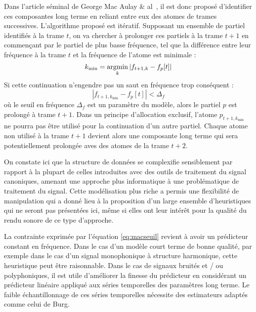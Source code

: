 Dans l'article séminal de George Mac Aulay \& al~\cite{mcaulay}, il est donc proposé \og d'identifier \fg ces composantes long terme en reliant entre eux des atomes de trames successives. L'algorithme proposé est itératif. Supposant un ensemble de partiel identifiés à la trame $t$, on va chercher à prolonger ces partiels à la trame $t+1$ en commençant par le partiel de plus basse fréquence, tel que la différence entre leur fréquence à la trame $t$ et la fréquence de l'atome est minimale :
\begin{equation}
k_{\mathrm{min}} = \operatorname*{argmin}_{k}\left|f_{t+1, k}-f_{p}[t]\right|
\label{eq:mac}
\end{equation}
Si cette continuation n'engendre pas un saut en fréquence trop conséquent :
\begin{equation}
\left|f_{t+1, k_{\mathrm{min}}}-f_{p}[t]\right|<\Delta_{f}
\label{eq:macseuil}
\end{equation}
où le seuil en fréquence $\Delta_{f}$ est un paramètre du modèle, alors le partiel $p$ est prolongé à trame $t+1$. Dans un principe d'allocation exclusif, l'atome $p_{t+1, k_{\mathrm{min}}}$ ne pourra pas être utilisé pour la continuation d'un autre partiel. Chaque atome non utilisé à la trame $t+1$ devient alors une composante long terme qui sera potentiellement prolongée aves des atomes de la trame $t+2$.

On constate ici que la structure de données se complexifie sensiblement par rapport à la plupart de celles introduites avec des outils de traitement du signal canoniques, amenant une approche plus \og informatique \fg à une problématique de traitement du signal. Cette modélisation plus \og riche \fg a permis une flexibilité de manipulation qui a donné lieu à la proposition d'un large ensemble d'heuristiques qui ne seront pas présentées ici, même si elles ont leur intérêt pour la qualité du rendu sonore de ce type d'approche.



La contrainte exprimée par l'équation \ref{eq:macseuil} revient à avoir un prédicteur constant en fréquence. Dans le cas d'un modèle court terme de bonne qualité, par exemple dans le cas d'un signal monophonique à structure harmonique, cette heuristique peut être raisonnable. Dans le cas de signaux bruités et / ou polyphoniques, il est utile d'améliorer la finesse du prédicteur en considérant un prédicteur linéaire appliqué aux séries temporelles des paramètres long terme. Le faible échantillonnage de ces séries temporelles nécessite des estimateurs adaptés comme celui de Burg.~\cite{burg1968new}

